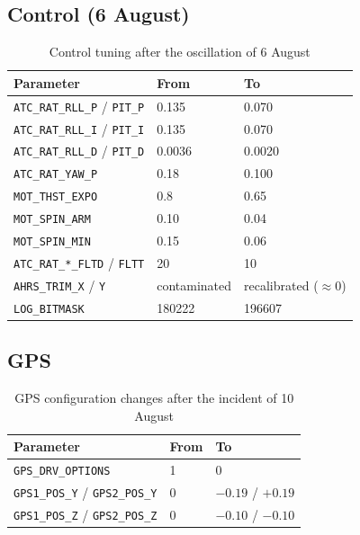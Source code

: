 \subsection{Control (6 August)}

\begin{table}[H]
    \centering
    \caption{Control tuning after the oscillation of 6 August}
    \label{tab:canvis-control}
    \begin{tabular}{lll}
        \toprule
        Parameter & From & To \\
        \midrule
        \texttt{ATC\_RAT\_RLL\_P} / \texttt{PIT\_P} & 0.135 & 0.070 \\
        \texttt{ATC\_RAT\_RLL\_I} / \texttt{PIT\_I} & 0.135 & 0.070 \\
        \texttt{ATC\_RAT\_RLL\_D} / \texttt{PIT\_D} & 0.0036 & 0.0020 \\
        \texttt{ATC\_RAT\_YAW\_P} & 0.18 & 0.100 \\
        \texttt{MOT\_THST\_EXPO} & 0.8 & 0.65 \\
        \texttt{MOT\_SPIN\_ARM} & 0.10 & 0.04 \\
        \texttt{MOT\_SPIN\_MIN} & 0.15 & 0.06 \\
        \texttt{ATC\_RAT\_*\_FLTD} / \texttt{FLTT} & 20 & 10 \\
        \texttt{AHRS\_TRIM\_X} / \texttt{Y} & contaminated & recalibrated ($\approx 0$) \\
        \texttt{LOG\_BITMASK} & 180222 & 196607 \\
        \bottomrule
    \end{tabular}
\end{table}

\subsection{GPS}

\begin{table}[H]
    \centering
    \caption{GPS configuration changes after the incident of 10 August}
    \label{tab:canvis-gps}
    \begin{tabular}{lll}
        \toprule
        Parameter & From & To \\
        \midrule
        \texttt{GPS\_DRV\_OPTIONS} & 1 & 0 \\
        \texttt{GPS1\_POS\_Y} / \texttt{GPS2\_POS\_Y} & 0 & $-0.19$ / $+0.19$ \\
        \texttt{GPS1\_POS\_Z} / \texttt{GPS2\_POS\_Z} & 0 & $-0.10$ / $-0.10$ \\
        \bottomrule
    \end{tabular}
\end{table}

